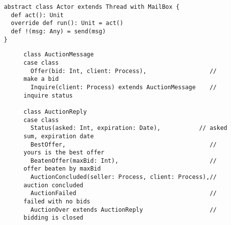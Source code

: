 
\begin{lstlisting}
abstract class Actor extends Thread with MailBox {
  def act(): Unit
  override def run(): Unit = act()
  def !(msg: Any) = send(msg)
}
\end{lstlisting}


\begin{figure}[thb]
\begin{lstlisting}
class AuctionMessage
case class
  Offer(bid: Int, client: Process),                  // make a bid
  Inquire(client: Process) extends AuctionMessage    // inquire status

class AuctionReply
case class
  Status(asked: Int, expiration: Date),           // asked sum, expiration date
  BestOffer,                                         // yours is the best offer
  BeatenOffer(maxBid: Int),                          // offer beaten by maxBid
  AuctionConcluded(seller: Process, client: Process),// auction concluded
  AuctionFailed                                      // failed with no bids
  AuctionOver extends AuctionReply                   // bidding is closed
\end{lstlisting}
\end{figure}

